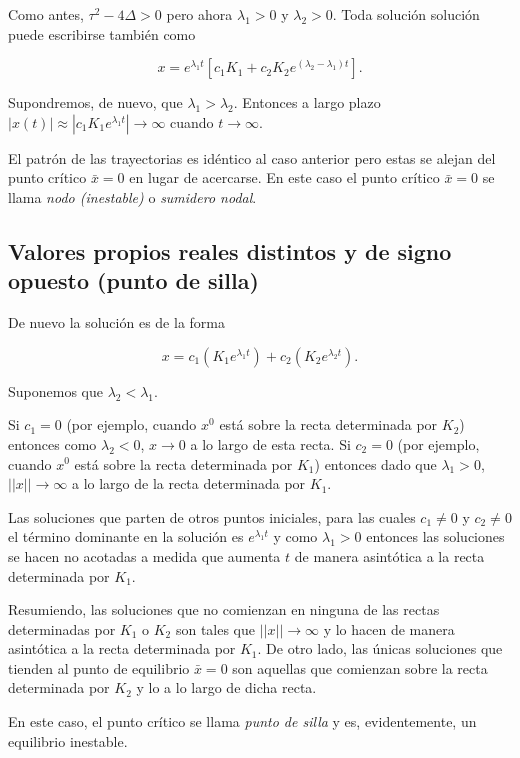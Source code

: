 \documentclass[11pt]{book}
\theoremstyle{definition}
\numberwithin{definition}{section}
\theoremstyle{theorem}
\numberwithin{theorem}{section}
\numberwithin{lemma}{section}
\numberwithin{corollary}{section}
\theoremstyle{plain}
\numberwithin{example}{section}
\begin{document}
Como antes, $\tau^2 - 4\Delta > 0$ pero ahora $\lambda_1 > 0$ y $\lambda_2 > 0$.
Toda solución solución puede escribirse también como

$$ x = e^{\lambda_1 t} [ c_1 K_1 + c_2K_2 e^{(\lambda_2 - \lambda_1)t} ].$$

Supondremos, de nuevo, que $\lambda_1 > \lambda_2$. Entonces a largo plazo $|x(t)| \approx |c_1 K_1 e^{\lambda_1 t}| \to \infty$ cuando $t \to \infty$.

El patrón de las trayectorias es idéntico al caso anterior pero estas se alejan del punto crítico $\bar{x} = 0$ en lugar de acercarse. En este caso el punto crítico $\bar{x} = 0$ se llama \emph{nodo (inestable)} o \emph{sumidero nodal}.

\subsection{Valores propios reales distintos y de signo opuesto (punto de silla)}

De nuevo la solución es de la forma

$$ x = c_1(K_1 e^{\lambda_1 t}) + c_2(K_2 e^{\lambda_2 t}). $$

Suponemos que $\lambda_2 < \lambda_1$.

Si $c_1 = 0$ (por ejemplo, cuando $x^0$ está sobre la recta determinada por $K_2$) entonces como $\lambda_2 < 0$, $x \to 0$ a lo largo de esta recta.
Si $c_2 = 0$ (por ejemplo, cuando $x^0$ está sobre la recta determinada por $K_1$) entonces dado que $\lambda_1 >0$, $||x|| \to \infty$ a lo largo de la recta determinada por $K_1$.

Las soluciones que parten de otros puntos iniciales, para las cuales $c_1 \neq 0$ y $c_2 \neq 0$ el término dominante en la solución es $e^{\lambda_1 t}$ y como $\lambda_1 > 0$ entonces las soluciones se hacen no acotadas a medida que aumenta $t$ de manera asintótica a la recta determinada por $K_1$.

Resumiendo, las soluciones que no comienzan en ninguna de las rectas determinadas por $K_1$ o $K_2$ son tales que $||x|| \to \infty$ y lo hacen de manera asintótica a la recta determinada por $K_1$. De otro lado, las únicas soluciones que tienden al punto de equilibrio $\bar{x} = 0$ son aquellas que comienzan sobre la recta determinada por $K_2$ y lo a lo largo de dicha recta.

En este caso, el punto crítico se llama \emph{punto de silla} y es, evidentemente, un equilibrio inestable.
\end{document}
